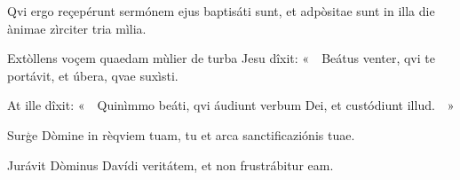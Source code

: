 Qvi ergo reçepérunt sermónem ejus baptisáti sunt, et adpòsitae sunt in illa die ànimae zìrciter tria mìlia.


Extòllens voçem quaedam mùlier de turba Jesu dîxit: «~~Beátus venter, qvi te portávit, et úbera, qvae suxìsti.

At ille dîxit: «~~Quinìmmo beáti, qvi áudiunt verbum Dei, et custódiunt illud.~~»

Surģe Dòmine in rèqviem tuam, tu et arca sanctificaziónis tuae.

Jurávit Dòminus Davídi veritátem, et non frustrábitur eam.

